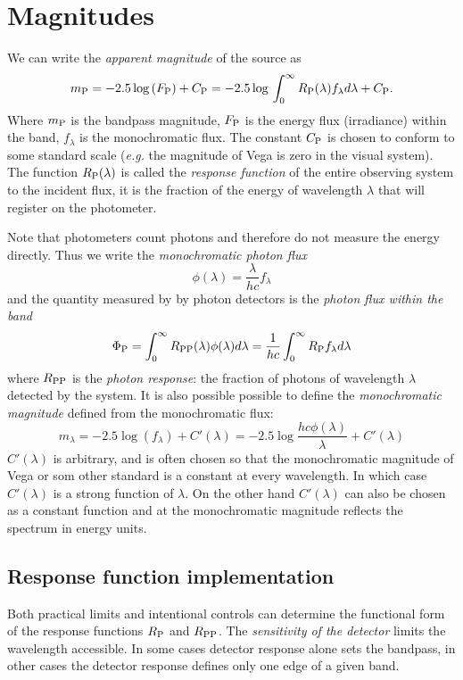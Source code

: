 \section{Magnitudes}
We can write the {\it apparent magnitude} of the source as 
\[
m_{\rm P}=-2.5\log{(F_{\rm P})}+C_{\rm
  P}=-2.5\log{}\int_0^\infty R_{\rm P}(\lambda)f_\lambda
d\lambda+C_{\rm P}.
\]
Where $m_{\rm P}$ is the bandpass magnitude, $F_{\rm P}$ is the energy
flux (irradiance) within the band, $f_\lambda$ is the monochromatic
flux. The constant $C_{\rm P}$ is chosen to conform to some standard
scale ({\it e.g.} the magnitude of Vega is zero in the visual
system). The function $R_{\rm P}(\lambda)$ is called the {\it response
  function} of the entire observing system to the incident flux, it is
the fraction of the energy of wavelength $\lambda$ that will register
on the photometer.

Note that photometers count photons and therefore do not measure the
energy directly. Thus we write the {\it monochromatic photon flux} 
\[
\phi(\lambda)=\frac{\lambda}{hc}f_\lambda
\]
and the quantity measured by by photon detectors is the {\it photon
  flux within the band}
\[
\Phi_{\rm P}=\int_0^\infty R_{\rm
  PP}(\lambda)\phi(\lambda)d\lambda=\frac{1}{hc}\int_0^\infty R_{\rm
  P}f_\lambda d\lambda
\]
where $R_{\rm PP}$ is the {\it photon response}: the fraction of
photons of wavelength $\lambda$ detected by the system. It is also
possible possible to define the {\it monochromatic magnitude} defined
from the monochromatic flux:
\[
m_\lambda=-2.5\log{(f_\lambda)}+C'(\lambda)=-2.5\log{\frac{hc\phi(\lambda)}{\lambda}}+C'(\lambda)
\]
$C'(\lambda)$ is arbitrary, and is often chosen so that the
monochromatic magnitude of Vega or som other standard is a constant
at every wavelength. In which case $C'(\lambda)$ is a strong function
of $\lambda$. On the other hand $C'(\lambda)$ can also be chosen as a
constant function and at the monochromatic magnitude reflects the
spectrum in energy units. 
\subsection{Response function implementation} 
Both practical limits and intentional controls can determine the
functional form of the response functions $R_{\rm P}$ and $R_{\rm
  PP}$. The {\it sensitivity of the detector} limits the wavelength
accessible. In some cases detector response alone sets the bandpass, in
other cases the detector response defines only one edge of a given
band. 

